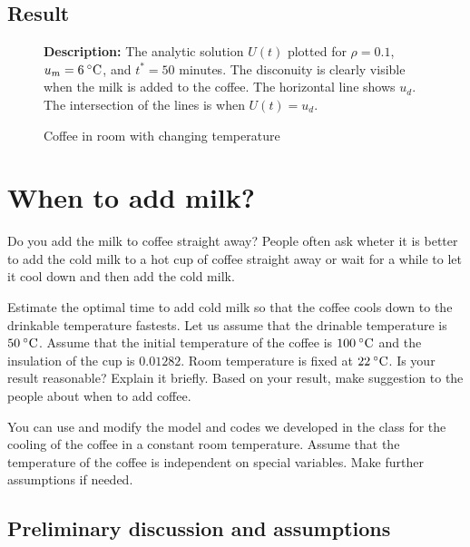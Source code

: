 \documentclass[11pt,oneside]{extarticle}
\newcommand{\Celsius}{\:\degree\mathrm{C}}
\numberwithin{equation}{section}
\numberwithin{figure}{section}
\begin{document}
\subsection{Result}

\begin{figure}[H]
    \caption{Coffee in room with changing temperature}
    \label{fig:analytic}
    \begin{center}
        {\graphicspath{{./figures/}}
        } 
        
        \scriptsize{ {\bf Description:} The analytic solution $U(t)$ plotted for $\rho = 0.1$,
        $u_{m} = 6\Celsius$, and $t^* = 50$ minutes. The disconuity is clearly visible when
        the milk is added to the coffee. The horizontal line shows $u_d$. The intersection
        of the lines is when $U(t)=u_d$.}
    \end{center}
\end{figure}

\newpage

\section{When to add milk?}

\par Do you add the milk to coffee straight away? People often ask wheter it is better
to add the cold milk to a hot cup of coffee straight away or wait for a while to
let it cool down and then add the cold milk.

\par Estimate the optimal time to add cold milk so that the coffee cools down to
the drinkable temperature fastests. Let us assume that the drinable temperature
is $50\Celsius$. Assume that the initial temperature of the coffee is $100\Celsius$
and the insulation of the cup is $0.01282$. Room temperature is fixed at $22\Celsius$.
Is your result reasonable? Explain it briefly. Based on your result, make suggestion
to the people about when to add coffee.


\par You can use and modify the model and codes we developed in the class for the
cooling of the coffee in a constant room temperature. Assume that the temperature
of the coffee is independent on special variables. Make further assumptions if needed.

\subsection{Preliminary discussion and assumptions}
\end{document}
